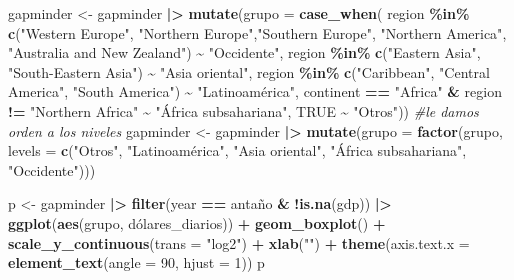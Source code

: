 \documentclass[
]{article}
\newenvironment{Shaded}{\begin{snugshade}}{\end{snugshade}}
\newcommand{\AttributeTok}[1]{\textcolor[rgb]{0.13,0.29,0.53}{#1}}
\newcommand{\CommentTok}[1]{\textcolor[rgb]{0.56,0.35,0.01}{\textit{#1}}}
\newcommand{\ConstantTok}[1]{\textcolor[rgb]{0.56,0.35,0.01}{#1}}
\newcommand{\DecValTok}[1]{\textcolor[rgb]{0.00,0.00,0.81}{#1}}
\newcommand{\FunctionTok}[1]{\textcolor[rgb]{0.13,0.29,0.53}{\textbf{#1}}}
\newcommand{\NormalTok}[1]{#1}
\newcommand{\OtherTok}[1]{\textcolor[rgb]{0.56,0.35,0.01}{#1}}
\newcommand{\SpecialCharTok}[1]{\textcolor[rgb]{0.81,0.36,0.00}{\textbf{#1}}}
\newcommand{\StringTok}[1]{\textcolor[rgb]{0.31,0.60,0.02}{#1}}
\begin{document}
\begin{Shaded}
\begin{Highlighting}[]
\NormalTok{gapminder }\OtherTok{\textless{}{-}}\NormalTok{ gapminder }\SpecialCharTok{|\textgreater{}}
  \FunctionTok{mutate}\NormalTok{(}\AttributeTok{grupo =} \FunctionTok{case\_when}\NormalTok{(}
\NormalTok{    region }\SpecialCharTok{\%in\%} \FunctionTok{c}\NormalTok{(}\StringTok{"Western Europe"}\NormalTok{, }\StringTok{"Northern Europe"}\NormalTok{,}\StringTok{"Southern Europe"}\NormalTok{,}
                  \StringTok{"Northern America"}\NormalTok{,}
                  \StringTok{"Australia and New Zealand"}\NormalTok{) }\SpecialCharTok{\textasciitilde{}} \StringTok{"Occidente"}\NormalTok{,}
\NormalTok{    region }\SpecialCharTok{\%in\%} \FunctionTok{c}\NormalTok{(}\StringTok{"Eastern Asia"}\NormalTok{, }\StringTok{"South{-}Eastern Asia"}\NormalTok{) }\SpecialCharTok{\textasciitilde{}} \StringTok{"Asia oriental"}\NormalTok{,}
\NormalTok{    region }\SpecialCharTok{\%in\%} \FunctionTok{c}\NormalTok{(}\StringTok{"Caribbean"}\NormalTok{, }\StringTok{"Central America"}\NormalTok{,}
                  \StringTok{"South America"}\NormalTok{) }\SpecialCharTok{\textasciitilde{}} \StringTok{"Latinoamérica"}\NormalTok{,}
\NormalTok{    continent }\SpecialCharTok{==} \StringTok{"Africa"} \SpecialCharTok{\&}
\NormalTok{      region }\SpecialCharTok{!=} \StringTok{"Northern Africa"} \SpecialCharTok{\textasciitilde{}} \StringTok{"África subsahariana"}\NormalTok{,}
    \ConstantTok{TRUE} \SpecialCharTok{\textasciitilde{}} \StringTok{"Otros"}\NormalTok{))}
\CommentTok{\#le damos orden a los niveles}
\NormalTok{gapminder }\OtherTok{\textless{}{-}}\NormalTok{ gapminder }\SpecialCharTok{|\textgreater{}}
  \FunctionTok{mutate}\NormalTok{(}\AttributeTok{grupo =} \FunctionTok{factor}\NormalTok{(grupo, }\AttributeTok{levels =} \FunctionTok{c}\NormalTok{(}\StringTok{"Otros"}\NormalTok{, }\StringTok{"Latinoamérica"}\NormalTok{,}
                                          \StringTok{"Asia oriental"}\NormalTok{, }\StringTok{"África subsahariana"}\NormalTok{,}
                                          \StringTok{"Occidente"}\NormalTok{)))}

\NormalTok{p }\OtherTok{\textless{}{-}}\NormalTok{ gapminder }\SpecialCharTok{|\textgreater{}}
  \FunctionTok{filter}\NormalTok{(year }\SpecialCharTok{==}\NormalTok{ antaño }\SpecialCharTok{\&} \SpecialCharTok{!}\FunctionTok{is.na}\NormalTok{(gdp)) }\SpecialCharTok{|\textgreater{}}
  \FunctionTok{ggplot}\NormalTok{(}\FunctionTok{aes}\NormalTok{(grupo, dólares\_diarios)) }\SpecialCharTok{+}
  \FunctionTok{geom\_boxplot}\NormalTok{() }\SpecialCharTok{+}
  \FunctionTok{scale\_y\_continuous}\NormalTok{(}\AttributeTok{trans =} \StringTok{"log2"}\NormalTok{) }\SpecialCharTok{+}
  \FunctionTok{xlab}\NormalTok{(}\StringTok{""}\NormalTok{) }\SpecialCharTok{+}
  \FunctionTok{theme}\NormalTok{(}\AttributeTok{axis.text.x =} \FunctionTok{element\_text}\NormalTok{(}\AttributeTok{angle =} \DecValTok{90}\NormalTok{, }\AttributeTok{hjust =} \DecValTok{1}\NormalTok{))}
\NormalTok{p}
\end{Highlighting}
\end{Shaded}
\end{document}
